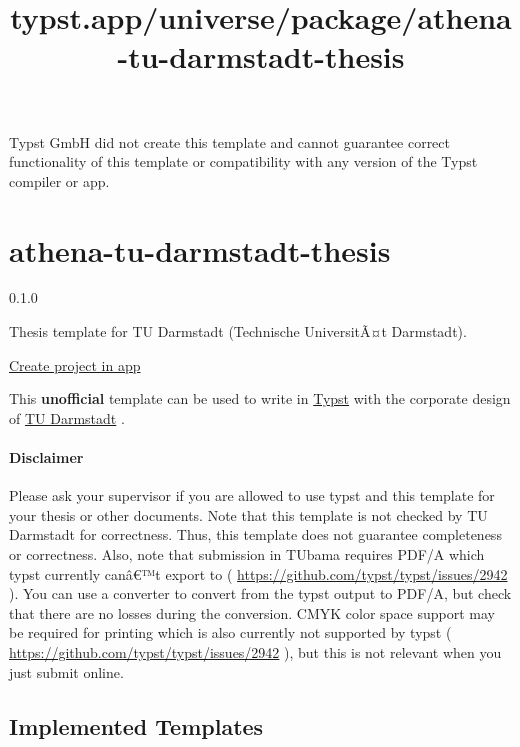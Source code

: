 Typst GmbH did not create this template and cannot guarantee correct
functionality of this template or compatibility with any version of the
Typst compiler or app.


\title{typst.app/universe/package/athena-tu-darmstadt-thesis}

\label{banner}
\label{template-thumbnail}

\section{athena-tu-darmstadt-thesis}\label{athena-tu-darmstadt-thesis}

{ 0.1.0 }

Thesis template for TU Darmstadt (Technische UniversitÃ¤t Darmstadt).

\href{/app?template=athena-tu-darmstadt-thesis&version=0.1.0}{Create
project in app}

\label{readme}
This \textbf{unofficial} template can be used to write in
\href{https://github.com/typst/typst}{Typst} with the corporate design
of \href{https://www.tu-darmstadt.de/}{TU Darmstadt} .

\paragraph{Disclaimer}\label{disclaimer}

Please ask your supervisor if you are allowed to use typst and this
template for your thesis or other documents. Note that this template is
not checked by TU Darmstadt for correctness. Thus, this template does
not guarantee completeness or correctness. Also, note that submission in
TUbama requires PDF/A which typst currently canâ€™t export to (
\url{https://github.com/typst/typst/issues/2942} ). You can use a
converter to convert from the typst output to PDF/A, but check that
there are no losses during the conversion. CMYK color space support may
be required for printing which is also currently not supported by typst
( \url{https://github.com/typst/typst/issues/2942} ), but this is not
relevant when you just submit online.

\subsection{Implemented Templates}\label{implemented-templates}

